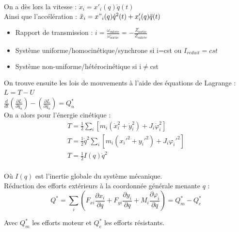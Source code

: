 \documentclass[../main.tex]{subfiles}
\begin{document}
On a dès lors la vitesse : $\dot{x}_i = x'_i(q)\dot{q}(t)$\\
Ainsi que l'accélération : $\Ddot{x}_i = x"_i(q) \dot{q}^2(t) + x'_i(q) \Ddot{q}(t)$\\

\begin{itemize}
    \item Rapport de transmission : $i=\frac{\omega_{\text{entrée}}}{\omega_{\text{sortie}}} = -\frac{Z_{\text{sortie}}}{Z_{\text{entrée}}}$\\
    \item Système uniforme/homocinétique/synchrone si i=cst ou $I_{reduit} = cst$\\
    \item Système non-uniforme/hétérocinétique si i$\neq$cst\\
\end{itemize}

On trouve ensuite les lois de mouvements à l'aide des équations de Lagrange : $L = T-U$\\
$\frac{d}{dt}(\frac{\partial L}{\partial \dot{q}_n}) - (\frac{\partial L}{\partial q_n}) = Q_n^*$\\

On a alors pour l'énergie cinétique : \begin{equation}
    \begin{gathered}
        T = \frac{1}{2}\sum_i [m_i(\dot{x}^2_i + \dot{y}^2_i) + J_i \dot{\varphi}^2_i]\\
        T = \frac{1}{2} \dot{q}^2 \sum_i [m_i (x_i'^2+y_i'^2) + J_i \varphi_i'^2]\\
        T = \frac{1}{2} I(q) \dot{q}^2\\
    \end{gathered}
\end{equation}

Où $I(q)$ est l'inertie globale du système mécanique.\\

Réduction des efforts extérieurs à la coordonnée générale menante $q$ : \\
\begin{equation}
    Q^* = \sum_i (F_{xi} \frac{\partial x_i}{\partial q} + F_{yi} \frac{\partial y_i}{\partial q} + M_i \frac{\partial \varphi_i}{\partial q}) = Q_m^* - Q_e^*
\end{equation}

Avec $Q_m^*$ les efforts moteur et $Q_e^*$ les efforts résistants.\\
\end{document}
